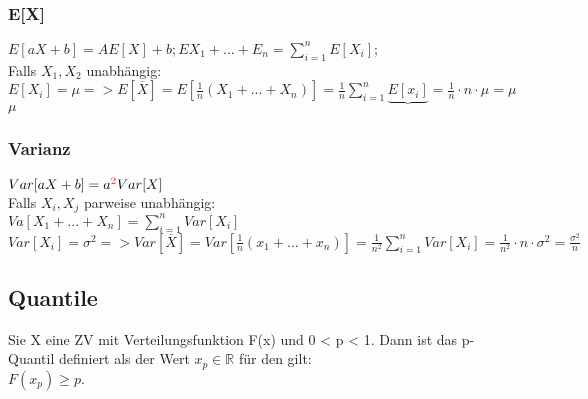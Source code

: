 \subsubsection{E[X]}
$E[aX + b] = AE[X]+b;E{X_{1}+ ...+ E_{n}} = \sum_{i=1}^{n} E[X_{i}];$\\
Falls $X_{1}, X_{2}$ unabhängig:\\
$E[X_{i}] = \mu => E[\overline{X}] = E[\frac{1}{n}(X_{1} + ...+ X_{n})] =  \frac{1}{n}\sum_{i=1}^{n} \underbrace{E[x_{i}]} = \frac{1}{n}\cdot n \cdot \mu = \mu$\\
$\mu$\\
\subsubsection{Varianz}
$Var[aX + b] = a\textcolor{red}{^2}Var[X]$\\
Falls $X_{i}, X_{j}$ parweise unabhängig:\\
$Va[X_{1} + ... + X_{n}] = \sum_{i=1}^{n} Var[X_{i}]$\\
$Var[X_{i}] = \sigma^2 => Var[\overline{X}] = Var[\frac{1}{n}(x_{1} + ... + x_{n})] = \frac{1}{n^2} \sum_{i=1}^{n} Var[X_{i}] = \frac{1}{n^2} \cdot n \cdot \sigma^2 = \frac{\sigma^2}{n}$
\subsection{Quantile}
Sie X eine ZV mit Verteilungsfunktion F(x) und 0 < p < 1. Dann ist das p-Quantil definiert als der Wert $x_{p} \in \mathbb{R}$ für den gilt:\\
$F(x_{p}) \ge p.$